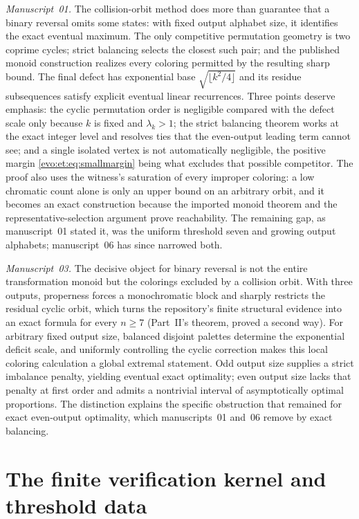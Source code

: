 \documentclass[11pt,a4paper]{article}
\numberwithin{equation}{section}
\theoremstyle{definition}
\theoremstyle{remark}
\begin{document}
\emph{Manuscript~01.} The collision-orbit method does more than guarantee that
a binary reversal omits some states: with fixed output alphabet size, it
identifies the exact eventual maximum. The only competitive permutation
geometry is two coprime cycles; strict balancing selects the closest such
pair; and the published monoid construction realizes every coloring
permitted by the resulting sharp bound. The final defect has exponential base
$\sqrt{\lfloor k^2/4\rfloor}$ and its residue subsequences satisfy explicit
eventual linear recurrences. Three points deserve emphasis: the cyclic
permutation order is negligible compared with the defect scale only because
$k$ is fixed and $\lambda_k>1$; the strict balancing theorem works at the
exact integer level and resolves ties that the even-output leading term
cannot see; and a single isolated vertex is not automatically negligible, the
positive margin \eqref{evo:et:eq:smallmargin} being what excludes that
possible competitor. The proof also uses the witness's saturation of every
improper coloring: a low chromatic count alone is only an upper bound on an
arbitrary orbit, and it becomes an exact construction because the imported
monoid theorem and the representative-selection argument prove
reachability. The remaining gap, as manuscript~01 stated it, was the uniform
threshold seven and growing output alphabets; manuscript~06 has since
narrowed both.

\emph{Manuscript~03.} The decisive object for binary reversal is not the
entire transformation monoid but the colorings excluded by a collision orbit.
With three outputs, properness forces a monochromatic block and sharply
restricts the residual cyclic orbit, which turns the repository's finite
structural evidence into an exact formula for every $n\ge7$ (Part~II's
theorem, proved a second way). For arbitrary fixed output size, balanced
disjoint palettes determine the exponential deficit scale, and uniformly
controlling the cyclic correction makes this local coloring calculation a
global extremal statement. Odd output size supplies a strict imbalance
penalty, yielding eventual exact optimality; even output size lacks that
penalty at first order and admits a nontrivial interval of asymptotically
optimal proportions. The distinction explains the specific obstruction that
remained for exact even-output optimality, which manuscripts~01 and~06 remove
by exact balancing.

\section{The finite verification kernel and threshold data}\label{evo:sec:kernel}
\end{document}
